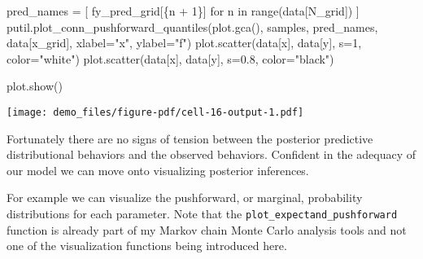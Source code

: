 \documentclass[
  letterpaper,
  DIV=11,
  numbers=noendperiod]{scrartcl}
\newenvironment{Shaded}{\begin{snugshade}}{\end{snugshade}}
\newcommand{\BuiltInTok}[1]{\textcolor[rgb]{0.00,0.23,0.31}{#1}}
\newcommand{\ControlFlowTok}[1]{\textcolor[rgb]{0.00,0.23,0.31}{#1}}
\newcommand{\DecValTok}[1]{\textcolor[rgb]{0.68,0.00,0.00}{#1}}
\newcommand{\FloatTok}[1]{\textcolor[rgb]{0.68,0.00,0.00}{#1}}
\newcommand{\KeywordTok}[1]{\textcolor[rgb]{0.00,0.23,0.31}{#1}}
\newcommand{\NormalTok}[1]{\textcolor[rgb]{0.00,0.23,0.31}{#1}}
\newcommand{\OperatorTok}[1]{\textcolor[rgb]{0.37,0.37,0.37}{#1}}
\newcommand{\SpecialCharTok}[1]{\textcolor[rgb]{0.37,0.37,0.37}{#1}}
\newcommand{\SpecialStringTok}[1]{\textcolor[rgb]{0.13,0.47,0.30}{#1}}
\newcommand{\StringTok}[1]{\textcolor[rgb]{0.13,0.47,0.30}{#1}}
\begin{document}
\begin{Shaded}
\begin{Highlighting}[]
\NormalTok{pred\_names }\OperatorTok{=}\NormalTok{ [ }\SpecialStringTok{f\textquotesingle{}y\_pred\_grid[}\SpecialCharTok{\{}\NormalTok{n }\OperatorTok{+} \DecValTok{1}\SpecialCharTok{\}}\SpecialStringTok{]\textquotesingle{}} \ControlFlowTok{for}\NormalTok{ n }\KeywordTok{in} \BuiltInTok{range}\NormalTok{(data[}\StringTok{\textquotesingle{}N\_grid\textquotesingle{}}\NormalTok{]) ]}
\NormalTok{putil.plot\_conn\_pushforward\_quantiles(plot.gca(), samples,}
\NormalTok{                                      pred\_names, data[}\StringTok{\textquotesingle{}x\_grid\textquotesingle{}}\NormalTok{],}
\NormalTok{                                      xlabel}\OperatorTok{=}\StringTok{"x"}\NormalTok{, ylabel}\OperatorTok{=}\StringTok{"f"}\NormalTok{)}
\NormalTok{plot.scatter(data[}\StringTok{\textquotesingle{}x\textquotesingle{}}\NormalTok{], data[}\StringTok{\textquotesingle{}y\textquotesingle{}}\NormalTok{], s}\OperatorTok{=}\DecValTok{1}\NormalTok{, color}\OperatorTok{=}\StringTok{"white"}\NormalTok{)}
\NormalTok{plot.scatter(data[}\StringTok{\textquotesingle{}x\textquotesingle{}}\NormalTok{], data[}\StringTok{\textquotesingle{}y\textquotesingle{}}\NormalTok{], s}\OperatorTok{=}\FloatTok{0.8}\NormalTok{, color}\OperatorTok{=}\StringTok{"black"}\NormalTok{)}

\NormalTok{plot.show()}
\end{Highlighting}
\end{Shaded}

\texttt{[image: demo\_files/figure-pdf/cell-16-output-1.pdf]}

Fortunately there are no signs of tension between the posterior
predictive distributional behaviors and the observed behaviors.
Confident in the adequacy of our model we can move onto visualizing
posterior inferences.

For example we can visualize the pushforward, or marginal, probability
distributions for each parameter. Note that the
\texttt{plot\_expectand\_pushforward} function is already part of my
Markov chain Monte Carlo analysis tools and not one of the visualization
functions being introduced here.
\end{document}
